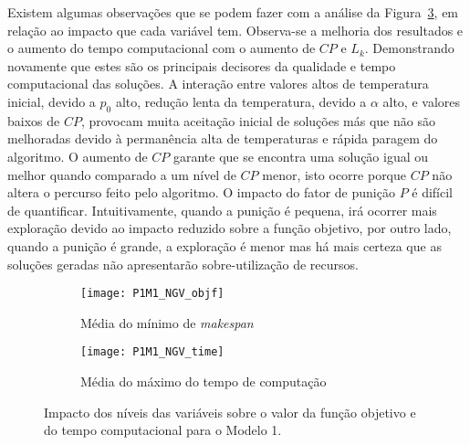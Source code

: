 Existem algumas observações que se podem fazer com a análise da Figura~\ref{fig:P1M1_NGV}, em relação ao impacto que cada variável tem. Observa-se a melhoria dos resultados e o aumento do tempo computacional com o aumento de $CP$ e $L_{k}$. Demonstrando novamente que estes são os principais decisores da qualidade e tempo computacional das soluções. A interação entre valores altos de temperatura inicial, devido a $p_{0}$ alto, redução lenta da temperatura, devido a $\alpha$ alto, e valores baixos de $CP$, provocam muita aceitação inicial de soluções más que não são melhoradas devido à permanência alta de temperaturas e rápida paragem do algoritmo. O aumento de $CP$ garante que se encontra uma solução igual ou melhor quando comparado a um nível de $CP$ menor, isto ocorre porque $CP$ não altera o percurso feito pelo algoritmo. O impacto do fator de punição $P$ é difícil de quantificar. Intuitivamente, quando a punição é pequena, irá ocorrer mais exploração devido ao impacto reduzido sobre a função objetivo, por outro lado, quando a punição é grande, a exploração é menor mas há mais certeza que as soluções geradas não apresentarão sobre-utilização de recursos.\\
\begin{figure}[H]
	\centering
	\begin{subfigure}{0.49\textwidth}
	\centering
		\texttt{[image: P1M1\_NGV\_objf]}
		\caption{Média do mínimo de \textit{makespan}}
		\label{fig:P1M1_NGV_objf}
	\end{subfigure}
	\begin{subfigure}{0.49\textwidth}
	\centering
		\texttt{[image: P1M1\_NGV\_time]}
		\caption{Média do máximo do tempo de computação}
		\label{fig:P1M1_NGV_time}
	\end{subfigure}
	\caption{Impacto dos níveis das variáveis sobre o valor da função objetivo e do tempo computacional para o Modelo 1.}
	\label{fig:P1M1_NGV}
\end{figure}

